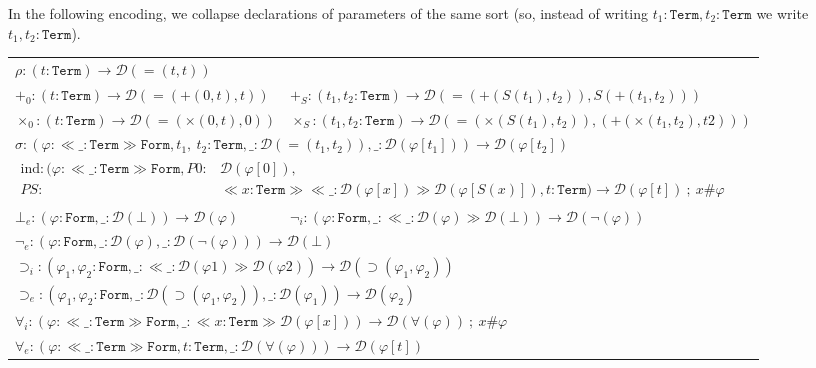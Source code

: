 \documentclass[copyright,creativecommons]{eptcs}
\newcounter{s}
\newcommand{\absort}[2]{\ensuremath{\ll\!\!#1\!\!\gg #2}}
\newcommand{\fresh}[2]{#1 \# #2}
\newcommand{\prf}{\ensuremath{\mathcal{D}}}
\newcommand{\Trm}{\texttt{Term}}
\newcommand{\Frm}{\texttt{Form}}
\begin{document}
In the following encoding, we collapse declarations of parameters of the same sort (so, instead of
writing $t_1 : \Trm, t_2: \Trm$ we write $t_1, t_2 : \Trm$).
\begingroup
\small
\begin{longtable}{ll}
\multicolumn{2}{l}{$\rho : (t : \Trm) \to \prf(=(t,t))$}\\[4pt]
$+_0 : (t : \Trm) \to \prf(=(+(0,t),t))$ & 
$+_S : (t_1, t_2 : \Trm) \to \prf(=(+(S(t_1),t_2)),S(+(t_1,t_2)))$\\[4pt]
$\times_0 : (t : \Trm) \to \prf(=(\times(0,t),0))$ &
$\times_S : (t_1, t_2 : \Trm) \to \prf(=(\times(S(t_1),t_2)),(+(\times(t_1,t_2),t2)))$\\[4pt]
\multicolumn{2}{l}{$\sigma : (\varphi {:} \absort{\_{:}\Trm}\Frm,t_1,\ t_2:\Trm,\_:\prf(=\!(t_1,t_2)),\_ :\prf(\varphi[t_1])) \to \prf(\varphi[t_2])$} \\[4pt]
\multicolumn{2}{l}{$\begin{aligned}\text{ind} : (\varphi {:}\absort{\_{:}\Trm}{\Frm},P0:&\prf(\varphi[0]),\\PS{:}&\absort{x{:}\Trm}{\absort{\_{:}\prf(\varphi[x])}{\prf(\varphi[S(x)])}},t{:}\Trm)
    \to \prf(\varphi[t]) \ ; \ \fresh{x}{\varphi}
\end{aligned}$}\\[6pt]
$\bot_e : (\varphi : \Frm, \_:\prf(\bot)) \to \prf(\varphi)$ &
$\neg_i : (\varphi {:} \Frm,\_:\absort{\_{:}\prf(\varphi)}{\prf(\bot)}) \to \prf(\neg(\varphi))$\\[4pt]
\multicolumn{2}{l}{$\neg_e  : (\varphi : \Frm, \_ :\prf(\varphi), \_ :\prf(\neg(\varphi))) \to \prf(\bot)$}\\[4pt]
\multicolumn{2}{l}{$\supset_i : (\varphi_1, \varphi_2 : \Frm, \_:\absort{\_{:}\prf(\varphi1)}{\prf(\varphi2)}) \to \prf(\supset(\varphi_1,\varphi_2))$}\\[4pt]
\multicolumn{2}{l}{$\supset_e : (\varphi_1, \varphi_2 : \Frm, \_ : \prf(\supset(\varphi_1,\varphi_2)), \_ : \prf(\varphi_1)) \to \prf(\varphi_2)$}\\[4pt]
\multicolumn{2}{l}{$\forall_i  : (\varphi : \absort{\_{:}\Trm}{\Frm},\_ :\absort{x{:}\Trm}{\prf(\varphi[x])}) \to \prf(\forall (\varphi)) \ ; \ \fresh{x}{\varphi}$}\\[4pt]
\multicolumn{2}{l}{$\forall_e  : (\varphi : \absort{\_{:}\Trm}{\Frm}, t : \Trm, \_ : \prf(\forall(\varphi))) \to \prf(\varphi[t])$}
\end{longtable}
\endgroup
\end{document}
